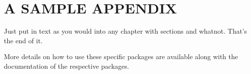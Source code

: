 \chapter{A SAMPLE APPENDIX}
\label{app:app1}

Just put in text as you would into any chapter with sections and
whatnot.  That's the end of it.


More details on how to use these specific packages are available along
with the documentation of the respective packages.